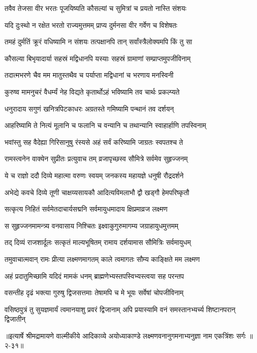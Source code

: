 \twolineshloka
{तवैव तेजसा वीर भरतः पूजयिष्यति}
{कौसल्यां च सुमित्रां च प्रयतो नास्ति संशयः} %

\twolineshloka
{यदि दुःस्थो न रक्षेत भरतो राज्यमुत्तमम्}
{प्राप्य दुर्मनसा वीर गर्वेण च विशेषतः} %

\twolineshloka
{तमहं दुर्मतिं क्रूरं वधिष्यामि न संशयः}
{तत्पक्षानपि तान् सर्वांस्त्रैलोक्यमपि किं तु सा} %

\twolineshloka
{कौसल्या बिभृयादार्या सहस्रं मद्विधानपि}
{यस्याः सहस्रं ग्रामाणां सम्प्राप्तमुपजीविनाम्} %

\twolineshloka
{तदात्मभरणे चैव मम मातुस्तथैव च}
{पर्याप्ता मद्विधानां च भरणाय मनस्विनी} %

\twolineshloka
{कुरुष्व मामनुचरं वैधर्म्यं नेह विद्यते}
{कृतार्थोऽहं भविष्यामि तव चार्थः प्रकल्प्यते} %

\twolineshloka
{धनुरादाय सगुणं खनित्रपिटकाधरः}
{अग्रतस्ते गमिष्यामि पन्थानं तव दर्शयन्} %

\twolineshloka
{आहरिष्यामि ते नित्यं मूलानि च फलानि च}
{वन्यानि च तथान्यानि स्वाहार्हाणि तपस्विनाम्} %

\twolineshloka
{भवांस्तु सह वैदेह्या गिरिसानुषु रंस्यसे}
{अहं सर्वं करिष्यामि जाग्रतः स्वपतश्च ते} %

\twolineshloka
{रामस्त्वनेन वाक्येन सुप्रीतः प्रत्युवाच तम्}
{व्रजापृच्छस्व सौमित्रे सर्वमेव सुहृज्जनम्} %

\twolineshloka
{ये च राज्ञो ददौ दिव्ये महात्मा वरुणः स्वयम्}
{जनकस्य महायज्ञे धनुषी रौद्रदर्शने} %

\twolineshloka
{अभेद्ये कवचे दिव्ये तूणी चाक्षय्यसायकौ}
{आदित्यविमलाभौ द्वौ खड्गौ हेमपरिष्कृतौ} %

\twolineshloka
{सत्कृत्य निहितं सर्वमेतदाचार्यसद्मनि}
{सर्वमायुधमादाय क्षिप्रमाव्रज लक्ष्मण} %

\twolineshloka
{स सुहृज्जनमामन्त्र्य वनवासाय निश्चितः}
{इक्ष्वाकुगुरुमागम्य जग्राहायुधमुत्तमम्} %

\twolineshloka
{तद् दिव्यं राजशार्दूलः सत्कृतं माल्यभूषितम्}
{रामाय दर्शयामास सौमित्रिः सर्वमायुधम्} %

\twolineshloka
{तमुवाचात्मवान् रामः प्रीत्या लक्ष्मणमागतम्}
{काले त्वमागतः सौम्य काङ्क्षिते मम लक्ष्मण} %

\twolineshloka
{अहं प्रदातुमिच्छामि यदिदं मामकं धनम्}
{ब्राह्मणेभ्यस्तपस्विभ्यस्त्वया सह परन्तप} %

\twolineshloka
{वसन्तीह दृढं भक्त्या गुरुषु द्विजसत्तमाः}
{तेषामपि च मे भूयः सर्वेषां चोपजीविनाम्} %

\twolineshloka
{वसिष्ठपुत्रं तु सुयज्ञमार्यं त्वमानयाशु प्रवरं द्विजानाम्}
{अपि प्रयास्यामि वनं समस्तानभ्यर्च्य शिष्टानपरान् द्विजातीन्} %


॥इत्यार्षे श्रीमद्रामायणे वाल्मीकीये आदिकाव्ये अयोध्याकाण्डे लक्ष्मणवनानुगमनाभ्यनुज्ञा नाम एकत्रिंशः सर्गः ॥२-३१॥
